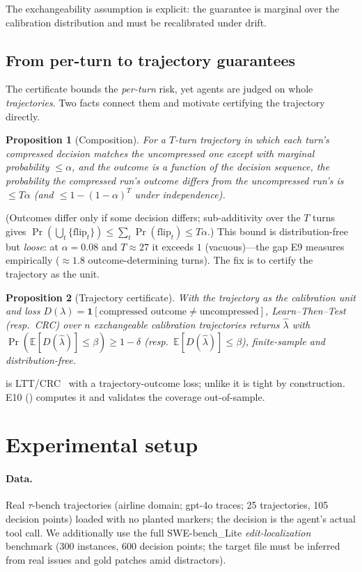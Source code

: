 \documentclass{article}
\newtheorem{proposition}{Proposition}
\begin{document}
The exchangeability assumption is explicit: the guarantee is marginal over the
calibration distribution and must be recalibrated under drift.

\subsection{From per-turn to trajectory guarantees}
\label{sec:traj-theory}
The certificate bounds the \emph{per-turn} risk, yet agents are judged on whole
\emph{trajectories}. Two facts connect them and motivate certifying the trajectory directly.

\begin{proposition}[Composition]\label{prop:compose}
For a $T$-turn trajectory in which each turn's compressed decision matches the uncompressed
one except with marginal probability $\le\alpha$, and the outcome is a function of the decision
sequence, the probability the compressed run's outcome differs from the uncompressed run's is
$\le T\alpha$ (and $\le 1-(1-\alpha)^{T}$ under independence).
\end{proposition}
\noindent (Outcomes differ only if some decision differs; sub-additivity over the $T$ turns
gives $\Pr(\bigcup_t\{\text{flip}_t\})\le\sum_t\Pr(\text{flip}_t)\le T\alpha$.) This bound is
distribution-free but \emph{loose}: at $\alpha=0.08$ and $T\approx27$
it exceeds $1$ (vacuous)---the gap E9 measures empirically ($\approx1.8$ outcome-determining
turns). The fix is to certify the trajectory as the unit.

\begin{proposition}[Trajectory certificate]\label{prop:trajcert}
With the trajectory as the calibration unit and loss $D(\lambda)=\mathbf 1[\text{compressed
outcome}\neq\text{uncompressed}]$, Learn--Then--Test (resp.\ CRC) over $n$ exchangeable
calibration trajectories returns $\hat\lambda$ with
$\Pr(\mathbb E[D(\hat\lambda)]\le\beta)\ge1-\delta$ (resp.\ $\mathbb E[D(\hat\lambda)]\le\beta$),
finite-sample and distribution-free.
\end{proposition}
\noindent {} is LTT/CRC~\cite{ltt,crc} with a trajectory-outcome loss; unlike
 it is tight by construction. E10 () computes it and validates
the coverage out-of-sample.

\section{Experimental setup}
\paragraph{Data.} Real $\tau$-bench trajectories (airline domain; gpt-4o traces;
25 trajectories, 105 decision points) loaded with no planted markers; the decision
is the agent's actual tool call. We additionally use the full SWE-bench\_Lite
\emph{edit-localization} benchmark (300 instances, 600 decision points; the
target file must be inferred from real issues and gold patches amid distractors).
\end{document}
